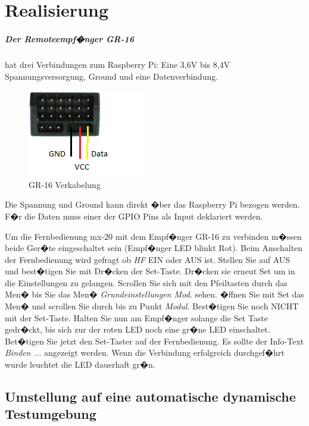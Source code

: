 ﻿\chapter{Realisierung}
\label{sec:real}


\paragraph{Der Remoteempf�nger GR-16} hat drei Verbindungen zum Raspberry Pi:
Eine 3,6V bis 8,4V Spannungsversorgung, Ground und eine Datenverbindung.
\label{Receiver}
\begin{figure}[H]
	\centering
	\includegraphics{fig_motor/GR-16.png}
	\caption[GR-16 Verkabelung]{GR-16 Verkabelung\protect\footnotemark}
\end{figure}
Die Spannung und Ground kann direkt �ber das Raspberry Pi bezogen werden. F�r die Daten muss einer der GPIO Pins als Input deklariert werden.

Um die Fernbedienung mx-20 mit dem Empf�nger GR-16 zu verbinden m�ssen beide Ger�te eingeschaltet sein (Empf�nger LED blinkt Rot). Beim Anschalten der Fernbedienung wird gefragt ob \emph{HF} EIN oder AUS ist. Stellen Sie auf AUS und best�tigen Sie mit Dr�cken der Set-Taste. Dr�cken sie erneut Set um in die Einstellungen zu gelangen. Scrollen Sie sich mit den Pfeiltasten durch das Men� bis Sie das Men� \emph{Grundeinstellungen Mod.} sehen. �ffnen Sie mit Set das Men� und scrollen Sie durch bis zu Punkt \emph{Modul}. Best�tigen Sie noch NICHT mit der Set-Taste. 
Halten Sie nun am Empf�nger solange die Set Taste gedr�ckt, bis sich zur der roten LED noch eine gr�ne LED einschaltet. Bet�tigen Sie jetzt den Set-Taster auf der Fernbedienung. Es sollte der Info-Text \emph{Binden ...} angezeigt werden.
Wenn die Verbindung erfolgreich durchgef�hrt wurde leuchtet die LED dauerhaft gr�n. \cite{doc:gt-16}

\newpage

\newpage
\section{Umstellung auf eine automatische dynamische Testumgebung}


